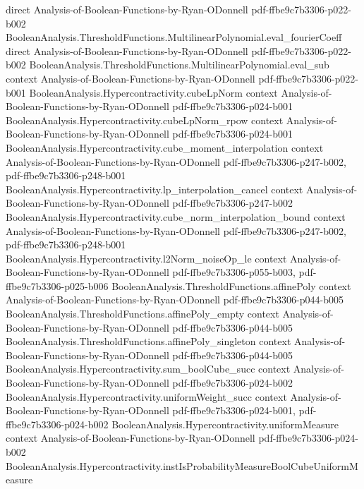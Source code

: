 \begin{lemma}
  {direct}
  {Analysis-of-Boolean-Functions-by-Ryan-ODonnell}
  {pdf-ffbe9c7b3306-p022-b002}
\proofstep
  {BooleanAnalysis.ThresholdFunctions.MultilinearPolynomial.eval_fourierCoeff}
  {direct}
  {Analysis-of-Boolean-Functions-by-Ryan-ODonnell}
  {pdf-ffbe9c7b3306-p022-b002}
\proofstep
  {BooleanAnalysis.ThresholdFunctions.MultilinearPolynomial.eval_sub}
  {context}
  {Analysis-of-Boolean-Functions-by-Ryan-ODonnell}
  {pdf-ffbe9c7b3306-p022-b001}
\proofstep
  {BooleanAnalysis.Hypercontractivity.cubeLpNorm}
  {context}
  {Analysis-of-Boolean-Functions-by-Ryan-ODonnell}
  {pdf-ffbe9c7b3306-p024-b001}
\proofstep
  {BooleanAnalysis.Hypercontractivity.cubeLpNorm_rpow}
  {context}
  {Analysis-of-Boolean-Functions-by-Ryan-ODonnell}
  {pdf-ffbe9c7b3306-p024-b001}
\proofstep
  {BooleanAnalysis.Hypercontractivity.cube_moment_interpolation}
  {context}
  {Analysis-of-Boolean-Functions-by-Ryan-ODonnell}
  {pdf-ffbe9c7b3306-p247-b002,
    pdf-ffbe9c7b3306-p248-b001}
\proofstep
  {BooleanAnalysis.Hypercontractivity.lp_interpolation_cancel}
  {context}
  {Analysis-of-Boolean-Functions-by-Ryan-ODonnell}
  {pdf-ffbe9c7b3306-p247-b002}
\proofstep
  {BooleanAnalysis.Hypercontractivity.cube_norm_interpolation_bound}
  {context}
  {Analysis-of-Boolean-Functions-by-Ryan-ODonnell}
  {pdf-ffbe9c7b3306-p247-b002,
    pdf-ffbe9c7b3306-p248-b001}
\proofstep
  {BooleanAnalysis.Hypercontractivity.l2Norm_noiseOp_le}
  {context}
  {Analysis-of-Boolean-Functions-by-Ryan-ODonnell}
  {pdf-ffbe9c7b3306-p055-b003,
    pdf-ffbe9c7b3306-p025-b006}
\proofstep
  {BooleanAnalysis.ThresholdFunctions.affinePoly}
  {context}
  {Analysis-of-Boolean-Functions-by-Ryan-ODonnell}
  {pdf-ffbe9c7b3306-p044-b005}
\proofstep
  {BooleanAnalysis.ThresholdFunctions.affinePoly_empty}
  {context}
  {Analysis-of-Boolean-Functions-by-Ryan-ODonnell}
  {pdf-ffbe9c7b3306-p044-b005}
\proofstep
  {BooleanAnalysis.ThresholdFunctions.affinePoly_singleton}
  {context}
  {Analysis-of-Boolean-Functions-by-Ryan-ODonnell}
  {pdf-ffbe9c7b3306-p044-b005}
\proofstep
  {BooleanAnalysis.Hypercontractivity.sum_boolCube_succ}
  {context}
  {Analysis-of-Boolean-Functions-by-Ryan-ODonnell}
  {pdf-ffbe9c7b3306-p024-b002}
\proofstep
  {BooleanAnalysis.Hypercontractivity.uniformWeight_succ}
  {context}
  {Analysis-of-Boolean-Functions-by-Ryan-ODonnell}
  {pdf-ffbe9c7b3306-p024-b001,
    pdf-ffbe9c7b3306-p024-b002}
\proofstep
  {BooleanAnalysis.Hypercontractivity.uniformMeasure}
  {context}
  {Analysis-of-Boolean-Functions-by-Ryan-ODonnell}
  {pdf-ffbe9c7b3306-p024-b002}
\proofstep
  {BooleanAnalysis.Hypercontractivity.instIsProbabilityMeasureBoolCubeUniformMeasure}

\end{lemma}
